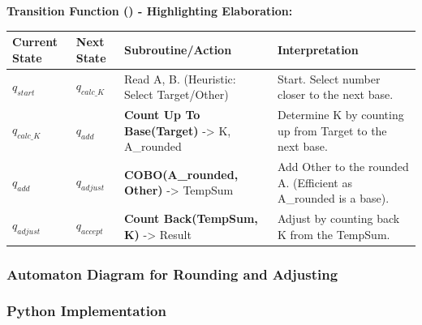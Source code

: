 \documentclass[11pt]{article}
\begin{document}
\textbf{Transition Function (\delta) - Highlighting Elaboration:}

\begin{longtable}{|l|l|l|l|}
\hline
\textbf{Current State} & \textbf{Next State} & \textbf{Subroutine/Action} & \textbf{Interpretation} \\
\hline
\endhead
$q_{start}$ & $q_{calc\_K}$ & Read A, B. (Heuristic: Select Target/Other) & Start. Select number closer to the next base. \\
\hline
$q_{calc\_K}$ & $q_{add}$ & \textbf{Count Up To Base(Target)} -> K, A\_rounded & Determine K by counting up from Target to the next base. \\
\hline
$q_{add}$ & $q_{adjust}$ & \textbf{COBO(A\_rounded, Other)} -> TempSum & Add Other to the rounded A. (Efficient as A\_rounded is a base). \\
\hline
$q_{adjust}$ & $q_{accept}$ & \textbf{Count Back(TempSum, K)} -> Result & Adjust by counting back K from the TempSum. \\
\hline
\end{longtable}

\subsubsection*{Automaton Diagram for Rounding and Adjusting}


\subsubsection*{Python Implementation}
\end{document}
